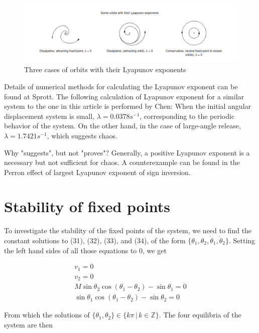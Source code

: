 \documentclass{article}
\begin{document}
\begin{figure}[!htbp]
    \includegraphics[width=\textwidth]{orbit.png}
  \caption{Three cases of orbits with their Lyapunov exponents}
\end{figure}


Details of numerical methods for calculating the Lyapunov exponent can be found at Sprott. The following calculation of Lyapunov exponent for a similar system to the one in this article is performed by Chen: When the initial angular displacement system is small, $\lambda = 0.0378 s^{-1}$, corresponding to the periodic behavior of the system. On the other hand, in the case of large-angle release, $\lambda =  1.7421 s^{-1}$, which suggests chaos.

Why "suggests", but not "proves"? Generally, a positive Lyapunov exponent is a necessary but not sufficient for chaos. A counterexample can be found in the Perron effect of largest Lyapunov exponent of sign inversion.

\section{Stability of fixed points}

To investigate the stability of the fixed points of the system, we need to find the constant solutions to (31), (32), (33), and (34), of the form $\{\theta_1, \theta_2, \dot\theta_1, \dot\theta_2\}$. Setting the left hand sides of all those equations to 0, we get

\begin{equation}
\begin{split}
v_1 = 0 \\
v_2 = 0 \\
M\sin\theta_2\cos(\theta_1 - \theta_2) - \sin\theta_1 = 0 \\
\sin\theta_1\cos(\theta_1 - \theta_2) - \sin\theta_2 = 0
\end{split}
\end{equation}

From which the solutions of $\{\theta_1, \theta_2\} \in \{k\pi \,|\, k \in \mathbb{Z}\}$. The four equilibria of the system are then
\end{document}
